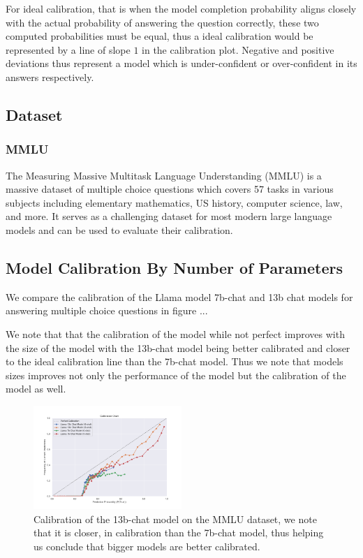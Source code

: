 \documentclass[11pt]{article}
\begin{document}
For ideal calibration, that is when the model completion probability aligns
closely with the actual probability of answering the question correctly, these 
two computed probabilities must be equal, thus a ideal calibration would be 
represented  by a line of slope $1$ in the calibration plot. Negative 
and positive deviations thus represent a model which is under-confident 
or over-confident  in its answers respectively.

\subsection{Dataset}

\subsubsection{MMLU}
The Measuring Massive Multitask Language Understanding (MMLU) 
\cite{hendrycks2021measuring} is a massive dataset of multiple choice 
questions which covers 57 tasks in various subjects including 
elementary mathematics, US history, computer science, law, and more. It 
serves as a challenging dataset for most modern large language models and can be used to evaluate their calibration.


\subsection{Model Calibration By Number of Parameters}

We compare the calibration of the Llama \cite{touvron2023llama} model 
7b-chat and 13b chat models for answering multiple choice questions in 
figure ... 

We note that that the calibration of the model while not perfect improves 
with the size of the model with the 13b-chat model being better calibrated 
and closer to the ideal calibration line than the 7b-chat model. Thus we 
note that models sizes improves not only the performance of the model but
the calibration of the model as well.

\begin{figure}
  \centering
  \includegraphics[width=0.5\textwidth]{figures/0-shot-7b-vs-13b-chat.png}
  \caption{Calibration of the 13b-chat model on the 
  MMLU dataset, we  note that it is closer, in calibration than the 7b-chat model, thus helping us conclude that bigger models are better calibrated.}
\end{figure}
\end{document}
